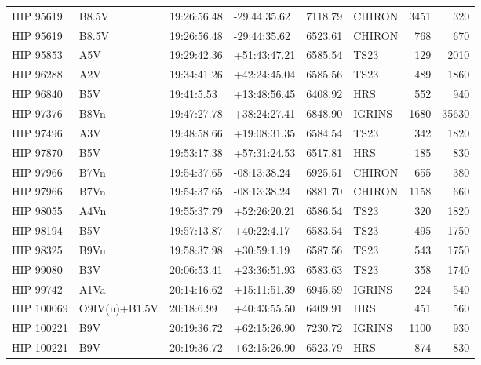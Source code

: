 \documentclass{emulateapj}
\begin{document}
\begin{longtable*}{|l|lllrlrr|}
   HIP 95619 &          B8.5V &    19:26:56.48 &   -29:44:35.62 &  7118.79 &     CHIRON &     3451 &     320 \\
   HIP 95619 &          B8.5V &    19:26:56.48 &   -29:44:35.62 &  6523.61 &     CHIRON &      768 &     670 \\
   HIP 95853 &            A5V &    19:29:42.36 &   +51:43:47.21 &  6585.54 &       TS23 &      129 &    2010 \\
   HIP 96288 &            A2V &    19:34:41.26 &   +42:24:45.04 &  6585.56 &       TS23 &      489 &    1860 \\
   HIP 96840 &            B5V &     19:41:5.53 &   +13:48:56.45 &  6408.92 &        HRS &      552 &     940 \\
   HIP 97376 &           B8Vn &    19:47:27.78 &   +38:24:27.41 &  6848.90 &     IGRINS &     1680 &   35630 \\
   HIP 97496 &            A3V &    19:48:58.66 &   +19:08:31.35 &  6584.54 &       TS23 &      342 &    1820 \\
   HIP 97870 &            B5V &    19:53:17.38 &   +57:31:24.53 &  6517.81 &        HRS &      185 &     830 \\
   HIP 97966 &           B7Vn &    19:54:37.65 &   -08:13:38.24 &  6925.51 &     CHIRON &      655 &     380 \\
   HIP 97966 &           B7Vn &    19:54:37.65 &   -08:13:38.24 &  6881.70 &     CHIRON &     1158 &     660 \\
   HIP 98055 &           A4Vn &    19:55:37.79 &   +52:26:20.21 &  6586.54 &       TS23 &      320 &    1820 \\
   HIP 98194 &            B5V &    19:57:13.87 &    +40:22:4.17 &  6583.54 &       TS23 &      495 &    1750 \\
   HIP 98325 &           B9Vn &    19:58:37.98 &    +30:59:1.19 &  6587.56 &       TS23 &      543 &    1750 \\
   HIP 99080 &            B3V &    20:06:53.41 &   +23:36:51.93 &  6583.63 &       TS23 &      358 &    1740 \\
   HIP 99742 &           A1Va &    20:14:16.62 &   +15:11:51.39 &  6945.59 &     IGRINS &      224 &     540 \\
  HIP 100069 &  O9IV(n)+B1.5V &     20:18:6.99 &   +40:43:55.50 &  6409.91 &        HRS &      451 &     560 \\
  HIP 100221 &            B9V &    20:19:36.72 &   +62:15:26.90 &  7230.72 &     IGRINS &     1100 &     930 \\
  HIP 100221 &            B9V &    20:19:36.72 &   +62:15:26.90 &  6523.79 &        HRS &      874 &     830 \\

\end{longtable*}
\end{document}
